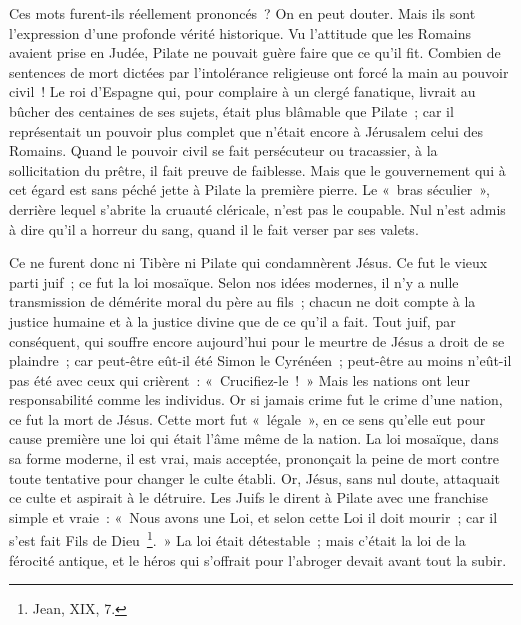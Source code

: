 \documentclass[french,twoside]{book} %
\begin{document}
Ces mots furent-ils réellement prononcés ? On en peut douter. Mais ils sont l’expression d’une profonde vérité historique. Vu l’attitude que les Romains avaient prise en Judée, Pilate ne pouvait guère faire que ce qu’il fit. Combien de sentences de mort dictées par l’intolérance religieuse ont forcé la main au pouvoir civil ! Le roi d’Espagne qui, pour complaire à un clergé fanatique, livrait au bûcher des centaines de ses sujets, était plus blâmable que Pilate ; car il représentait un pouvoir plus complet que n’était encore à Jérusalem celui des Romains. Quand le pouvoir civil se fait persécuteur ou tracassier, à la sollicitation du prêtre, il fait preuve de faiblesse. Mais que le gouvernement qui à cet égard est sans péché jette à Pilate la première pierre. Le « bras séculier », derrière lequel s’abrite la cruauté cléricale, n’est pas le coupable. Nul n’est admis à dire qu’il a horreur du sang, quand il le fait verser par ses valets.\par
Ce ne furent donc ni Tibère ni Pilate qui condamnèrent Jésus. Ce fut le vieux parti juif ; ce fut la loi mosaïque. Selon nos idées modernes, il n’y a nulle transmission de démérite moral du père au fils ; chacun ne doit compte à la justice humaine et à la justice divine que de ce qu’il a fait. Tout juif, par conséquent, qui souffre encore aujourd’hui pour le meurtre de Jésus a droit de se plaindre ; car peut-être eût-il été Simon le Cyrénéen ; peut-être au moins n’eût-il pas été avec ceux qui crièrent : « Crucifiez-le ! » Mais les nations ont leur responsabilité comme les individus. Or si jamais crime fut le crime d’une nation, ce fut la mort de Jésus. Cette mort fut « légale », en ce sens qu’elle eut pour cause première une loi qui était l’âme même de la nation. La loi mosaïque, dans sa forme moderne, il est vrai, mais acceptée, prononçait la peine de mort contre toute tentative pour changer le culte établi. Or, Jésus, sans nul doute, attaquait ce culte et aspirait à le détruire. Les Juifs le dirent à Pilate avec une franchise simple et vraie : « Nous avons une Loi, et selon cette Loi il doit mourir ; car il s’est fait Fils de Dieu \footnote{Jean, XIX, 7.}. » La loi était détestable ; mais c’était la loi de la férocité antique, et le héros qui s’offrait pour l’abroger devait avant tout la subir.\par
\end{document}
